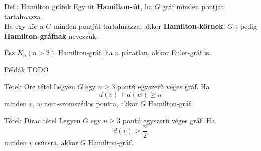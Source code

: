 \documentclass{beamer}
\begin{document}
\begin{frame}
\begin{block}{Def.: Hamilton gráfok}
Egy út \textbf{Hamilton-út}, ha $G$ gráf minden pontját tartalmazza.\\
\medskip
Ha egy kör a $G$ minden pontját tartalmazza, akkor \textbf{Hamilton-körnek}, $G$-t pedig \textbf{Hamilton-gráfnak} nevezzük.
\end{block}

\begin{block}{Ész}
$K_n(n > 2)$ Hamilton-gráf, ha $n$ páratlan, akkor Euler-gráf is.
\end{block}

\begin{block}{Példák}
TODO
\end{block}
\end{frame}

\begin{frame}
\begin{block}{Tétel: Ore tétel}
Legyen $G$ egy $n \geq 3$ pontú egyszerű véges gráf. Ha $$d(v) + d(w) \geq n$$ minden $v$, $w$ nem-szomszédos pontra, akkor $G$ Hamilton-gráf.
\end{block}

\begin{block}{Tétel: Dirac tétel}
Legyen $G$ egy $n \geq 3$ pontú egyszerű véges gráf. Ha $$d(v) \geq \frac{n}{2}$$ minden $v$ csúcsra, akkor $G$ Hamilton-gráf.
\end{block}
\end{frame}
\end{document}
